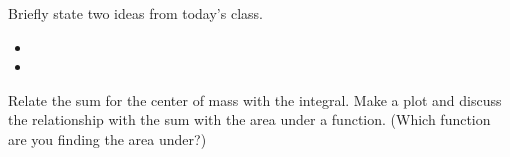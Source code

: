 \postClass

\begin{problem}
\item Briefly state two ideas from today's class.
  \begin{itemize}
  \item 
  \item 
  \end{itemize}
\item Relate the sum for the center of mass with the integral. Make a
  plot and discuss the relationship with the sum with the area under a
  function. (Which function are you finding the area under?)

  \vfill
\end{problem}



